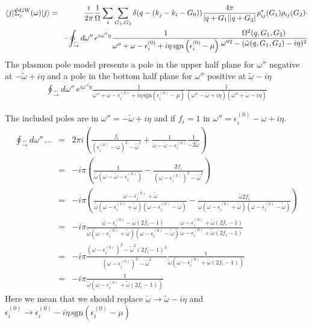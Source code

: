 \documentclass[fleqn]{article}
\begin{document}
\begin{eqnarray*}
\langle j | \tilde{\Sigma}^{\rm GW}_{c}(\omega) | j \rangle
&=&  \frac{i}{2 \pi} \frac{1}{\Omega} \sum_i \sum_{G_1,G_2} \delta(q-(k_j - k_i - G_0))
   \frac{4\pi}{|q+G_1||q+G_2|}
  \rho^*_{ij}(G_1) \rho_{ij}(G_2)  \cdot \\ && \cdot
  \oint_{{\overset{\curvearrowleft}{\rightarrow}}} d\omega'' \, e^{i \omega'' \eta} 
   \frac{1}{\omega'' + \omega - \epsilon^{(0)}_i + i \eta \mathrm{\, sgn} \left( \epsilon^{(0)}_i - \mu \right)}
   \frac{\Omega^2(q,G_1,G_2)}{\omega''^2 - (\tilde{\omega}(q,G_1,G_2) - i \eta)^2}
\end{eqnarray*}
The plasmon pole model presents a pole in the upper half plane for $\omega''$ negative
at $-\tilde{\omega}+i\eta$ and a pole in the bottom half plane for $\omega''$ positive
at $\tilde{\omega}-i\eta$
\begin{eqnarray*}
  \oint_{{\overset{\curvearrowleft}{\rightarrow}}} d\omega'' \, e^{i \omega'' \eta} 
   \frac{1}{\omega'' + \omega - \epsilon^{(0)}_i + i \eta \mathrm{\, sgn} \left( \epsilon^{(0)}_i - \mu \right)}
   \frac{1}{(\omega'' - \tilde{\omega} + i \eta)(\omega'' + \tilde{\omega} - i \eta)}
\end{eqnarray*}

The included poles are in $\omega'' = - \tilde{\omega} + i \eta$ and if $f_i=1$ in
$\omega'' = \epsilon^{(0)}_i - \omega + i \eta$.
\begin{eqnarray*}
\oint_{{\overset{\curvearrowleft}{\rightarrow}}} d\omega'' \, ... &=&
2 \pi i \left( \frac{f_i}{(\epsilon^{(0)}_i - \omega)^2 - \tilde{\omega}^2} +
             \frac{1}{\omega - \tilde{\omega} - \epsilon^{(0)}_i} \frac{1}{-2\tilde{\omega}} \right)
 \\ &=& - i \pi \left(  \frac{1}{\tilde{\omega} (\omega - \tilde{\omega} - \epsilon^{(0)}_i)} - 
    \frac{2 f_i}{(\omega - \epsilon^{(0)}_i)^2 - \tilde{\omega}^2} \right) \\
  &=& - i \pi \left( \frac{\omega - \epsilon^{(0)}_i + \tilde{\omega}}{\tilde{\omega} ( \omega - \epsilon^{(0)}_i + \tilde{\omega})  ( \omega - \epsilon^{(0)}_i - \tilde{\omega})} - 
 \frac{\tilde{\omega} 2 f_i}{\tilde{\omega} ( \omega - \epsilon^{(0)}_i + \tilde{\omega})  ( \omega - \epsilon^{(0)}_i - \tilde{\omega})} \right) \\
  &=& - i \pi \frac{\omega - \epsilon^{(0)}_i - \tilde{\omega}(2f_i - 1)}{\tilde{\omega} ( \omega - \epsilon^{(0)}_i + \tilde{\omega})  ( \omega - \epsilon^{(0)}_i - \tilde{\omega})} \frac{\omega - \epsilon^{(0)}_i + \tilde{\omega}(2f_i - 1)}{\omega - \epsilon^{(0)}_i + \tilde{\omega}(2f_i - 1)} \\
  &=& - i \pi \frac{(\omega - \epsilon^{(0)}_i)^2 - \tilde{\omega}^2 (2 f_i - 1)^2}
  {(\omega - \epsilon^{(0)}_i)^2 - \tilde{\omega}^2}
\frac{1}{\tilde{\omega} ( \omega - \epsilon^{(0)}_i + \tilde{\omega} (2 f_i - 1))} \\
  &=& - i \pi \frac{1}{\tilde{\omega} ( \omega - \epsilon^{(0)}_i + \tilde{\omega} (2 f_i - 1))}
\end{eqnarray*}
Here we mean that we should replace $\tilde{\omega} \rightarrow \tilde{\omega} - i\eta$
and $ \epsilon^{(0)}_i \rightarrow \epsilon^{(0)}_i -i \eta \mathrm{\, sgn}(\epsilon^{(0)}_i - \mu)$
\end{document}
